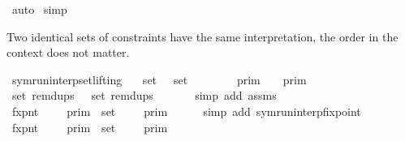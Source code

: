 \begin{isabellebody}
\ auto\isanewline
{}\isamarkupfalse%
\ simp%
\endisatagproof
{\isafoldproof}%
%
\isadelimproof
%
\endisadelimproof
%
\begin{isamarkuptext}%
Two identical sets of constraints have the same interpretation,
  the order in the context does not matter.%
\end{isamarkuptext}\isamarkuptrue%
\isamarkupfalse%
\ symrun{\isacharunderscore}interp{\isacharunderscore}set{\isacharunderscore}lifting{\isacharcolon}\isanewline
\ \ \ {\isacartoucheopen}set\ {\isasymGamma}\ {\isacharequal}\ set\ {\isasymGamma}{\isacharprime}{\isacartoucheclose}\isanewline
\ \ \ \ \ {\isacartoucheopen}{\isasymlbrakk}{\isasymlbrakk}\ {\isasymGamma}\ {\isasymrbrakk}{\isasymrbrakk}\isactrlsub p\isactrlsub r\isactrlsub i\isactrlsub m\ {\isacharequal}\ {\isasymlbrakk}{\isasymlbrakk}\ {\isasymGamma}{\isacharprime}\ {\isasymrbrakk}{\isasymrbrakk}\isactrlsub p\isactrlsub r\isactrlsub i\isactrlsub m{\isacartoucheclose}\isanewline
%
\isadelimproof
%
\endisadelimproof
%
\isatagproof
{}\isamarkupfalse%
\ {\isacharminus}\ \ \ \ \ \isanewline
\ \ \isamarkupfalse%
\ {\isacartoucheopen}set\ {\isacharparenleft}remdups\ {\isasymGamma}{\isacharparenright}\ {\isacharequal}\ set\ {\isacharparenleft}remdups\ {\isasymGamma}{\isacharprime}{\isacharparenright}{\isacartoucheclose}\isanewline
\ \ \ \ \isamarkupfalse%
\ {\isacharparenleft}simp\ add{\isacharcolon}\ assms{\isacharparenright}\isanewline
\ \ \isamarkupfalse%
\ \isamarkupfalse%
\ fxpnt{\isasymGamma}{\isacharcolon}\ {\isacartoucheopen}{\isasymInter}\ {\isacharparenleft}{\isacharparenleft}{\isasymlambda}{\isasymgamma}{\isachardot}\ {\isasymlbrakk}\ {\isasymgamma}\ {\isasymrbrakk}\isactrlsub p\isactrlsub r\isactrlsub i\isactrlsub m{\isacharparenright}\ {\isacharbackquote}\ set\ {\isasymGamma}{\isacharparenright}\ {\isacharequal}\ {\isasymlbrakk}{\isasymlbrakk}\ {\isasymGamma}\ {\isasymrbrakk}{\isasymrbrakk}\isactrlsub p\isactrlsub r\isactrlsub i\isactrlsub m{\isacartoucheclose}\isanewline
\ \ \ \ \isamarkupfalse%
\ {\isacharparenleft}simp\ add{\isacharcolon}\ symrun{\isacharunderscore}interp{\isacharunderscore}fixpoint{\isacharparenright}\isanewline
\ \ \isamarkupfalse%
\ \isamarkupfalse%
\ fxpnt{\isasymGamma}{\isacharprime}{\isacharcolon}\ {\isacartoucheopen}{\isasymInter}\ {\isacharparenleft}{\isacharparenleft}{\isasymlambda}{\isasymgamma}{\isachardot}\ {\isasymlbrakk}\ {\isasymgamma}\ {\isasymrbrakk}\isactrlsub p\isactrlsub r\isactrlsub i\isactrlsub m{\isacharparenright}\ {\isacharbackquote}\ set\ {\isasymGamma}{\isacharprime}{\isacharparenright}\ {\isacharequal}\ {\isasymlbrakk}{\isasymlbrakk}\ {\isasymGamma}{\isacharprime}\ {\isasymrbrakk}{\isasymrbrakk}\isactrlsub p\isactrlsub r\isactrlsub i\isactrlsub m{\isacartoucheclose}\isanewline

\end{isabellebody}
